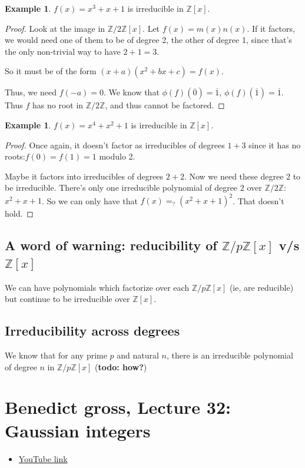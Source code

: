 \documentclass{book}
\newcommand{\Z}{\ensuremath{\mathbb{Z}}}
\theoremstyle{definition}
\newtheorem{example}[theorem]{Example}
\begin{document}
\begin{example}
    $f(x) = x^3 + x + 1$ is irreducible in $\Z[x]$.
\end{example}
\begin{proof}
    Look at the image in $\Z/2\Z[x]$. Let $f(x) = m(x) n(x)$. If it factors,
    we would need one of them to be of degree 2, the other of degree 1,
    since that's the only non-trivial way to have $2 + 1 = 3$.

    So it must be of the form $(x + a)(x^2 + bx + c) = f(x)$.

    Thus, we need $f(-a) = 0$. We know that
    $\phi(f)(\overline 0) = \overline 1$,
    $\phi(f)(\overline 1) = \overline 1$.
    Thus $f$ has no root in $\Z/2\Z$, and thus cannot be factored.
\end{proof}


\begin{example}
    $f(x) = x^4 + x^2 + 1$ is irreducible in $\Z[x]$.
\end{example}
\begin{proof}
    Once again, it doesn't factor as irreducibles of degrees $1 + 3$ since it has
    no roots:$f(0) = f(1) = 1$ modulo 2.

    Maybe it factors into irreducibles of degrees $2 + 2$.
    Now we need these degree 2 to be irreducible. There's only one
    irreducible polynomial of degree $2$ over $\Z/2\Z$: $x^2 + x + 1$.
    So we can only have that $f(x) =_? (x^2 + x + 1)^2$. That doesn't hold.
\end{proof}

\section{A word of warning: reducibility of $\Z/p\Z[x]$ v/s $\Z[x]$}

We can have polynomials which factorize over each $\Z/p\Z[x]$ (ie, are reducible)
but continue to be irreducible over $\Z[x]$.

\section{Irreducibility across degrees}

We know that for any prime $p$ and natural $n$, there is an irreducible
polynomial of degree $n$ in $\Z/p\Z[x]$ (\textbf{todo: how?})

\chapter{Benedict gross, Lecture 32: Gaussian integers}
\begin{itemize}
    \item \href{https://www.youtube.com/watch?v=Ln6IgLksDxE&list=PLelIK3uylPMGzHBuR3hLMHrYfMqWWsmx5&index=32}{YouTube link}
\end{itemize}
\end{document}
